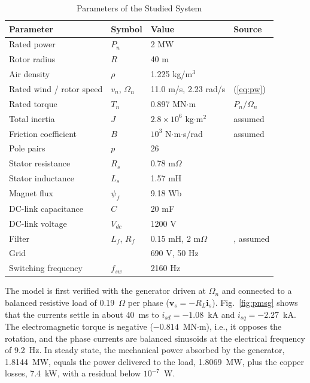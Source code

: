 \documentclass[conference]{IEEEtran}
\newcommand{\bv}[1]{\mathbf{#1}}
\begin{document}
\begin{table}[t]
\caption{Parameters of the Studied System}
\label{tab:param}
\centering
\footnotesize
\setlength{\tabcolsep}{3pt}
\begin{tabular}{llll}
\toprule
Parameter & Symbol & Value & Source\\
\midrule
Rated power & $P_n$ & 2 MW & \cite{hasan2021}\\
Rotor radius & $R$ & 40 m & \cite{rolan2009}\\
Air density & $\rho$ & 1.225 kg/m$^3$ & \cite{aimene2022}\\
Rated wind / rotor speed & $v_n$, $\Omega_n$ & 11.0 m/s, 2.23 rad/s & (\ref{eq:pw})\\
Rated torque & $T_n$ & 0.897 MN$\cdot$m & $P_n/\Omega_n$\\
Total inertia & $J$ & $2.8\times10^6$ kg$\cdot$m$^2$ & assumed\\
Friction coefficient & $B$ & $10^3$ N$\cdot$m$\cdot$s/rad & assumed\\
Pole pairs & $p$ & 26 & \cite{hasan2021}\\
Stator resistance & $R_s$ & 0.78 m$\Omega$ & \cite{hasan2021}\\
Stator inductance & $L_s$ & 1.57 mH & \cite{hasan2021}\\
Magnet flux & $\psi_f$ & 9.18 Wb & \cite{hasan2021}\\
DC-link capacitance & $C$ & 20 mF & \cite{hasan2021}\\
DC-link voltage & $V_{dc}$ & 1200 V & \cite{hasan2021}\\
Filter & $L_f$, $R_f$ & 0.15 mH, 2 m$\Omega$ & \cite{hasan2021}, assumed\\
Grid & & 690 V, 50 Hz & \cite{hasan2021}\\
Switching frequency & $f_{sw}$ & 2160 Hz & \cite{hasan2021}\\
\bottomrule
\end{tabular}
\end{table}

The model is first verified with the generator driven at $\Omega_n$ and connected to a balanced
resistive load of 0.19~$\Omega$ per phase ($\bv{v}_s=-R_L\bv{i}_s$). Fig.~\ref{fig:pmsg} shows that the
currents settle in about 40~ms to $i_{sd}=-1.08$~kA and $i_{sq}=-2.27$~kA. The electromagnetic torque is
negative ($-0.814$~MN$\cdot$m), i.e., it opposes the rotation, and the phase currents are balanced
sinusoids at the electrical frequency of 9.2~Hz. In steady state, the mechanical power absorbed by the
generator, 1.8144~MW, equals the power delivered to the load, 1.8069~MW, plus the copper losses,
7.4~kW, with a residual below $10^{-7}$~W.
\end{document}
